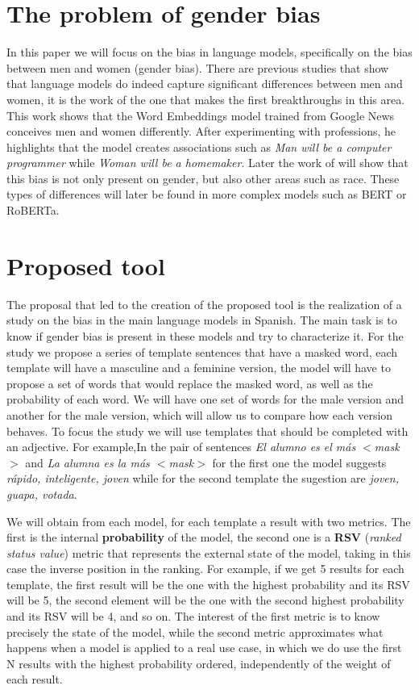 \documentclass[
twocolumn,
]{ceurart}
\begin{document}
\section{The problem of gender bias}
In this paper we will focus on the bias in language models, specifically on the bias between men and women (gender bias). There are previous studies that show that language models do indeed capture significant differences between men and women, it is the work of \citet{BolukbasiCZSK16a} the one that makes the first breakthroughs in this area. This work shows that the Word Embeddings model trained from Google News conceives men and women differently. After experimenting with professions, he highlights that the model creates associations such as \emph{Man will be a computer programmer} while \emph{Woman will be a homemaker}. Later the work of \citet{Caliskan_2017} will show that this bias is not only present on gender, but also other areas such as race. These types of differences will later be found in more complex models such as BERT\cite{BenderEmily} or RoBERTa\cite{Shanya_2021}.

\section{Proposed tool}
The proposal that led to the creation of the proposed tool is the realization of a study on the bias in the main language models in Spanish. The main task is to know if gender bias is present in these models and try to characterize it. For the study we propose a series of template sentences that have a masked word, each template will have a masculine and a feminine version, the model will have to propose a set of words that would replace the masked word, as well as the probability of each word. We will have one set of words for the male version and another for the male version, which will allow us to compare how each version behaves. To focus the study we will use templates that should be completed with an adjective. For example,In the pair of sentences \emph{El alumno es el más $<$mask$>$} and \emph{La alumna es la más $<$mask$>$} for the first one the model suggests \emph{rápido, inteligente, joven} while for the second template the sugestion are \emph{joven, guapa, votada}.

We will obtain from each model, for each template a result with two metrics. The first is the internal \textbf{probability} of the model, the second one is a \textbf{RSV} (\emph{ranked status value}) metric that represents the external state of the model, taking in this case the inverse position in the ranking. For example, if we get 5 results for each template, the first result will be the one with the highest probability and its RSV will be 5, the second element will be the one with the second highest probability and its RSV will be 4, and so on. The interest of the first metric is to know precisely the state of the model, while the second metric approximates what happens when a model is applied to a real use case, in which we do use the first N results with the highest probability ordered, independently of the weight of each result. 
\end{document}
